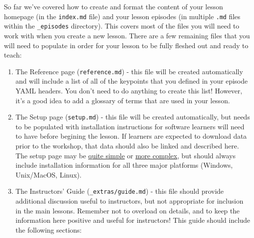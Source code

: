 \documentclass[]{book}
\begin{document}
So far we've covered how to create and format the content of your lesson homepage (in the \texttt{index.md} file)
and your lesson episodes (in multiple \texttt{.md} files within the \texttt{\_episodes} directory). This covers most of the
files you will need to work with when you create a new lesson. There are a few remaining files that you will
need to populate in order for your lesson to be fully fleshed out and ready to teach:

\begin{enumerate}
\def\labelenumi{\arabic{enumi}.}
\item
  The Reference page (\texttt{reference.md}) - this file will be created automatically and will include a list
  of all of the keypoints that you defined in your episode YAML headers. You don't need to do anything to create
  this list! However, it's a good idea to add a glossary of terms that are used in your lesson.
\item
  The Setup page (\texttt{setup.md}) - this file will be created automatically, but needs to be populated with
  installation instructions for software learners will need to have before begining the lesson. If learners are
  expected to download data prior to the workshop, that data should also be linked and described here. The setup
  page may be \href{http://swcarpentry.github.io/git-novice/setup.html}{quite simple} or
  \href{https://datacarpentry.org/geospatial-workshop/setup.html}{more complex}, but should
  always include installation information for all three major platforms (Windows, Unix/MacOS, Linux).
\item
  The Instructors' Guide (\texttt{\_extras/guide.md}) - this file should provide additional discussion useful to
  instructors,
  but not appropriate for inclusion in the main lessons. Remember not to overload on details, and to keep the
  information here positive and useful for instructors! This guide should include the following sections:
\end{enumerate}
\end{document}
